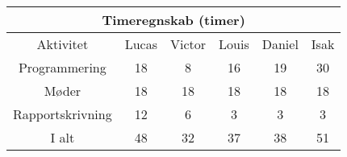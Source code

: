 \centering
\begin{tabular}{ |c|c|c|c|c|c|  }
 \hline
 \multicolumn{6}{|c|}{Timeregnskab (timer)} \\
 \hline
 Aktivitet & Lucas & Victor & Louis & Daniel & Isak\\
 \hline
 
 
 Programmering      & 18 & 8 & 16 & 19 & 30 \\
 
 Møder              & 18 & 18 & 18 & 18 & 18 \\
 
 Rapportskrivning   & 12 & 6 & 3 & 3 & 3 \\
 
 \hline
 
 I alt              & 48 & 32 & 37 & 38 & 51 \\
 
 
 \hline
\end{tabular}